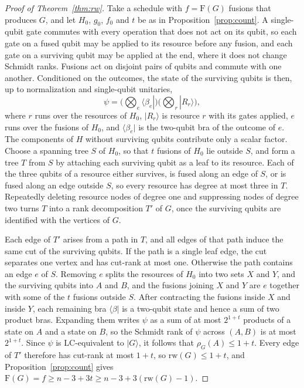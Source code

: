 \documentclass[aps,pra,onecolumn,superscriptaddress,nofootinbib,longbibliography]{revtex4-2}
\theoremstyle{plain}
\theoremstyle{remark}
\newcommand{\F}{\mathrm{F}}
\newcommand{\LC}{\mathrm{LC}}
\newcommand{\rw}{\mathrm{rw}}
\begin{document}
\begin{proof}[Proof of Theorem~\ref{thm:rw}]
Take a schedule with $f=\F(G)$ fusions that produces $G$, and let $H_0$, $g_0$, $f_0$ and $t$ be as in
Proposition~\ref{prop:count}. A single-qubit gate commutes with every operation that does not act on its
qubit, so each gate on a fused qubit may be applied to its resource before any fusion, and each gate on a
surviving qubit may be applied at the end, where it does not change Schmidt ranks. Fusions act on disjoint
pairs of qubits and commute with one another. Conditioned on the outcomes, the state of the surviving qubits
is then, up to normalization and single-qubit unitaries,
\[
  \psi=\Big(\bigotimes_{e}\langle\beta_e|\Big)\Big(\bigotimes_{r}|R_r\rangle\Big),
\]
where $r$ runs over the resources of $H_0$, $|R_r\rangle$ is resource $r$ with its gates applied, $e$ runs
over the fusions of $H_0$, and $\langle\beta_e|$ is the two-qubit bra of the outcome of $e$. The components of
$H$ without surviving qubits contribute only a scalar factor. Choose a spanning tree $S$ of $H_0$, so that
$t$ fusions of $H_0$ lie outside $S$, and form a tree $T$ from $S$ by attaching each surviving qubit as a leaf
to its resource. Each of the three qubits of a resource either survives, is fused along an edge of $S$, or
is fused along an edge outside $S$, so every resource has degree at most three in $T$. Repeatedly deleting
resource nodes of degree one and suppressing nodes of degree two turns $T$ into a rank decomposition $T'$
of $G$, once the surviving qubits are identified with the vertices of $G$.

Each edge of $T'$ arises from a path in $T$, and all edges of that path induce the same cut of the
surviving qubits. If the path is a single leaf edge, the cut separates one vertex and has cut-rank at most
one. Otherwise the path contains an edge $e$ of $S$. Removing $e$ splits the resources of $H_0$ into two
sets $X$ and $Y$, and the surviving qubits into $A$ and $B$, and the fusions joining $X$ and $Y$ are $e$
together with some of the $t$ fusions outside $S$. After contracting the fusions inside $X$ and inside $Y$,
each remaining bra $\langle\beta|$ is a two-qubit state and hence a sum of two product bras. Expanding them
writes $\psi$ as a sum of at most $2^{1+t}$ products of a state on $A$ and a state on $B$, so the Schmidt
rank of $\psi$ across $(A,B)$ is at most $2^{1+t}$. Since $\psi$ is $\LC$-equivalent to $|G\rangle$, it
follows that $\rho_G(A)\le 1+t$. Every edge of $T'$ therefore has cut-rank at most $1+t$, so
$\rw(G)\le 1+t$, and Proposition~\ref{prop:count} gives $\F(G)=f\ge n-3+3t\ge n-3+3(\rw(G)-1)$.
\end{proof}
\end{document}
